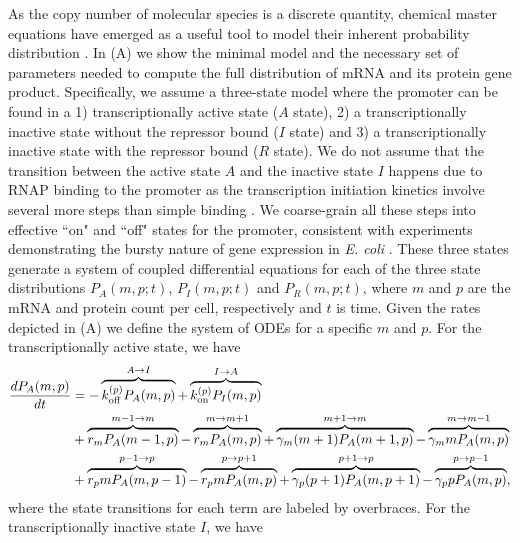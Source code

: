 As the copy number of molecular species is a discrete quantity, chemical master
equations have emerged as a useful tool to model their inherent probability
distribution \cite{Sanchez2013}. In (A) we show the
minimal model and the necessary set of parameters needed to compute the full
distribution of mRNA and its protein gene product. Specifically, we assume a
three-state model where the promoter can be found in a 1) transcriptionally
active state  ($A$ state), 2) a transcriptionally inactive state without the
repressor bound ($I$ state) and 3) a transcriptionally inactive state with the
repressor bound ($R$ state). We do not assume that the transition between the
active state $A$ and the inactive state $I$ happens due to RNAP binding to the
promoter as the transcription initiation kinetics involve several more steps
than simple binding \cite{Browning2004}. We coarse-grain all these steps into
effective ``on" and ``off" states for the promoter, consistent with experiments
demonstrating the bursty nature of gene expression in {\it E. coli}
\cite{Golding2005}. These three states generate a system of coupled
differential equations for each of the three state distributions $P_A(m, p;
t)$, $P_I(m, p; t)$ and $P_R(m, p; t)$, where $m$ and $p$ are the mRNA and
protein count per cell, respectively and $t$ is time. Given the rates depicted
in (A) we define the system of ODEs for a specific $m$
and $p$. For the transcriptionally active state, we have
\begin{equation}
  \begin{aligned}
    \dt{P_A(m, p)} &=
    - \overbrace{\kpoff P_A(m, p)}^{A \rightarrow I} %
    + \overbrace{\kpon P_I(m, p)}^{I \rightarrow A}\\ %
    &+ \overbrace{r_m P_A(m-1, p)}^{m-1 \rightarrow m} %
    - \overbrace{r_m P_A(m, p)}^{m \rightarrow m+1}%
    + \overbrace{\gm (m + 1) P_A(m+1 , p)}^{m+1 \rightarrow m} %
    - \overbrace{\gm m P_A(m , p)}^{m \rightarrow m-1}\\ %
    &+ \overbrace{r_p m P_A(m, p - 1)}^{p-1 \rightarrow p} %
    - \overbrace{r_p m P_A(m, p)}^{p \rightarrow p+1} %
    + \overbrace{\gp (p + 1) P_A(m, p + 1)}^{p + 1 \rightarrow p} %
    - \overbrace{\gp p P_A(m, p)}^{p \rightarrow p-1}, %
  \end{aligned}
\end{equation}
where the state transitions for each term are labeled by overbraces. For the
transcriptionally inactive state $I$, we have
